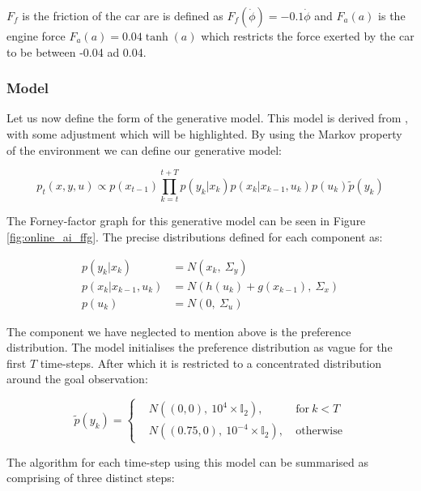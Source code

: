 \documentclass{article}
\begin{document}
$F_f$ is the friction of the car are is defined as $F_f(\dot{\phi}) = -0.1 \dot{\phi}$ and $F_a(a)$ is the engine force $F_a(a) = 0.04 \tanh(a)$ which restricts the force exerted by the car to be between -0.04 ad 0.04.

\subsubsection{Model}

Let us now define the form of the generative model. This model is derived from \citet{van2019simulating}, with some adjustment which will be highlighted. By using the Markov property of the environment we can define our generative model:

\begin{equation}\label{eq:mountain_car_generative_model}
	p_t(x, y, u) \propto p(x_{t-1}) \prod_{k=t}^{t + T} p(y_k | x_k) p(x_k | x_{k-1}, u_k)p(u_k)\tilde{p}(y_k)
\end{equation}

The Forney-factor graph for this generative model can be seen in Figure \ref{fig:online_ai_ffg}. The precise distributions defined for each component as:

\begin{equation}
\begin{aligned}
	p(y_k | x_k) &= N(x_k, \ \Sigma_y ) \\
	p(x_k | x_{k-1}, u_k) &= N(h(u_k) + g(x_{k-1}), \ \Sigma_x) \\
	p(u_k) &= N(0, \ \Sigma_u)
\end{aligned}	
\end{equation}

The component we have neglected to mention above is the preference distribution. The model initialises the preference distribution as vague for the first $T$ time-steps. After which it is restricted to a concentrated distribution around the goal observation:

\begin{equation}
	\tilde{p}(y_k) = \left\{
	\begin{aligned}
		& N\left((0, 0), \ 10^{4} \times \mathbb{I}_2 \right) , \ & \text{for} \ k < T \\
		& N\left((0.75, 0), \ 10^{-4} \times \mathbb{I}_2 \right) , \ & \text{otherwise}
	\end{aligned}
	\right.
\end{equation}

The algorithm for each time-step using this model can be summarised as comprising of three distinct steps:
\end{document}
